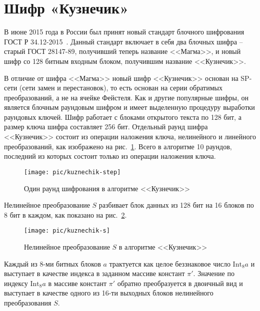 \section{Шифр «Кузнечик»}\label{section-grig}

В июне 2015 года в России был принят новый стандарт блочного шифрования ГОСТ Р 34.12-2015~\cite{GOST-R:34.12-2015}. Данный стандарт включает в себя два блочных шифра -- старый ГОСТ 28147-89, получивший теперь название <<Магма>>, и новый шифр со 128 битным входным блоком, получившим название <<Кузнечик>>.

В отличие от шифра <<Магма>> новый шифр <<Кузнечик>> основан на SP-сети (сети замен и перестановок), то есть основан на серии обратимых преобразований, а не на ячейке Фейстеля. Как и другие популярные шифры, он является блочным раундовым шифром и имеет выделенную процедуру выработки раундовых ключей. Шифр работает с блоками открытого текста по 128 бит, а размер ключа шифра составляет 256 бит. Отдельный раунд шифра <<Кузнечик>> состоит из операции наложения ключа, нелинейного и линейного преобразований, как изображено на рис.~\ref{fig:kuznechik-step}. Всего в алгоритме 10 раундов, последний из которых состоит только из операции наложения ключа. 

\begin{figure}[htb]
	\centering
	\texttt{[image: pic/kuznechik-step]}
  \caption{Один раунд шифрования в алгоритме <<Кузнечик>>}
  \label{fig:kuznechik-step}
\end{figure}

Нелинейное преобразование $S$ разбивает блок данных из 128 бит на 16 блоков по 8 бит в каждом, как показано на рис.~\ref{fig:kuznechik-s}.

\begin{figure}[htb]
	\centering
	\texttt{[image: pic/kuznechik-s]}
  \caption{Нелинейное преобразование $S$ в алгоритме <<Кузнечик>>}
  \label{fig:kuznechik-s}
\end{figure}

Каждый из 8-ми битных блоков $a$ трактуется как целое беззнаковое число $\text{Int}_8 a$ и выступает в качестве индекса в заданном массиве констант $\pi'$. Значение по индексу $\text{Int}_8 a$ в массиве констант $\pi'$ обратно преобразуется в двоичный вид и выступает в качестве одного из 16-ти выходных блоков нелинейного преобразования $S$.

